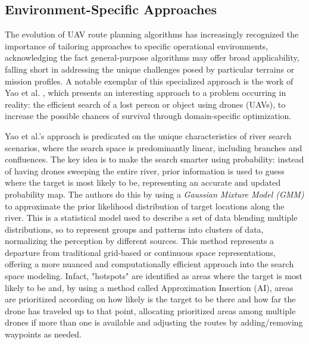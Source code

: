 \documentclass[conference]{IEEEtran}
\begin{document}
\subsection{Environment-Specific Approaches}

The evolution of UAV route planning algorithms has increasingly recognized the importance of tailoring approaches to specific operational environments, acknowledging the fact general-purpose algorithms may offer broad applicability, falling short in addressing the unique challenges posed by particular terrains or mission profiles. A notable exemplar of this specialized approach is the work of Yao et al. \cite{paper5}, which presents an interesting approach to a problem occurring in reality: the efficient search of a lost person or object using drones (UAVs), to increase the possible chances of survival through domain-specific optimization.

Yao et al.'s approach is predicated on the unique characteristics of river search scenarios, where the search space is predominantly linear, including branches and confluences. The key idea is to make the search smarter using probability: instead of having drones sweeping the entire river, prior information is used to guess where the target is most likely to be, representing an accurate and updated probability map. The authors do this by using a \textit{Gaussian Mixture Model (GMM)} to approximate the prior likelihood distribution of target locations along the river. This is a statistical model used to describe a set of data blending multiple distributions, so to represent groups and patterns into clusters of data, normalizing the perception by different sources. This method represents a departure from traditional grid-based or continuous space representations, offering a more nuanced and computationally efficient approach into the search space modeling. Infact, "hotspots" are identified as areas where the target is most likely to be and, by using a method called Approximation Insertion (AI), areas are prioritized according on how likely is the target to be there and how far the drone has traveled up to that point, allocating prioritized areas among multiple drones if more than one is available and adjusting the routes by adding/removing waypoints as needed. \\
\end{document}
